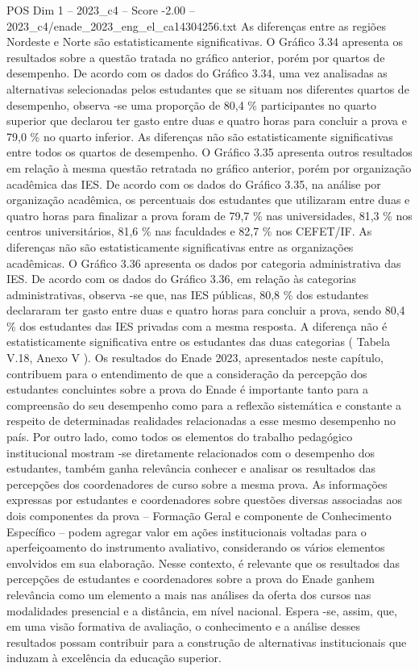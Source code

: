 \begin{textsample}{POS Dim 1 – 2023\_c4 – Score -2.00 – 2023\_c4/enade\_2023\_eng\_el\_ca14304256.txt}
As diferenças entre as regiões Nordeste e Norte são estatisticamente significativas.
O Gráfico 3.34 apresenta os resultados sobre a questão tratada no gráfico anterior, porém por quartos de desempenho.
De acordo com os dados do Gráfico 3.34, uma vez analisadas as alternativas selecionadas pelos estudantes que se situam nos diferentes quartos de desempenho, observa -se uma proporção de 80,4 \% participantes no quarto superior que declarou ter gasto entre duas e quatro horas para concluir a prova e 79,0 \% no quarto inferior.
As diferenças não são estatisticamente significativas entre todos os quartos de desempenho.
O Gráfico 3.35 apresenta outros resultados em relação à mesma questão retratada no gráfico anterior, porém por organização acadêmica das IES.
De acordo com os dados do Gráfico 3.35, na análise por organização acadêmica, os percentuais dos estudantes que utilizaram entre duas e quatro horas para finalizar a prova foram de 79,7 \% nas universidades, 81,3 \% nos centros universitários, 81,6 \% nas faculdades e 82,7 \% nos CEFET/IF.
As diferenças não são estatisticamente significativas entre as organizações acadêmicas.
O Gráfico 3.36 apresenta os dados por categoria administrativa das IES.
De acordo com os dados do Gráfico 3.36, em relação às categorias administrativas, observa -se que, nas IES públicas, 80,8 \% dos estudantes declararam ter gasto entre duas e quatro horas para concluir a prova, sendo 80,4 \% dos estudantes das IES privadas com a mesma resposta.
A diferença não é estatisticamente significativa entre os estudantes das duas categorias ( Tabela V.18, Anexo V ).
Os resultados do Enade 2023, apresentados neste capítulo, contribuem para o entendimento de que a consideração da percepção dos estudantes concluintes sobre a prova do Enade é importante tanto para a compreensão do seu desempenho como para a reflexão sistemática e constante a respeito de determinadas realidades relacionadas a esse mesmo desempenho no país.
Por outro lado, como todos os elementos do trabalho pedagógico institucional mostram -se diretamente relacionados com o desempenho dos estudantes, também ganha relevância conhecer e analisar os resultados das percepções dos coordenadores de curso sobre a mesma prova.
As informações expressas por estudantes e coordenadores sobre questões diversas associadas aos dois componentes da prova – Formação Geral e componente de Conhecimento Específico – podem agregar valor em ações institucionais voltadas para o aperfeiçoamento do instrumento avaliativo, considerando os vários elementos envolvidos em sua elaboração.
Nesse contexto, é relevante que os resultados das percepções de estudantes e coordenadores sobre a prova do Enade ganhem relevância como um elemento a mais nas análises da oferta dos cursos nas modalidades presencial e a distância, em nível nacional.
Espera -se, assim, que, em uma visão formativa de avaliação, o conhecimento e a análise desses resultados possam contribuir para a construção de alternativas institucionais que induzam à excelência da educação superior.

\end{textsample}
